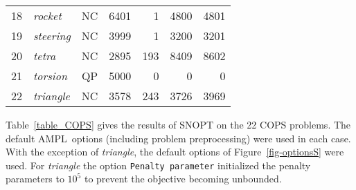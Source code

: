 \documentclass[draft,leqno,onefignum,onetabnum]{siamltex}
\def\strutl{\rule[-1.25ex]{0pt}{3ex}}%
\def\v#1{\texttt{#1}}
\def\AMPL  {{\small AMPL}}
\def\COPS  {{\small COPS}}
\def\SNOPT {{\small SNOPT}}
\def\Cute#1{\hbox{\it\lowercase{#1}\/}}
\begin{document}
\begin{table}[t]
\begin{center}
\begin{tabular}{|c|l|c|r|r|r|r|}
\\             18&\Cute{rocket}     & NC & 6401 &     1 &   4800 &  4801
\\             19&\Cute{steering}   & NC & 3999 &     1 &   3200 &  3201
\\             20&\Cute{tetra}      & NC & 2895 &   193 &   8409 &  8602
\\             21&\Cute{torsion}    & QP & 5000 &     0 &      0 &     0
\\\strutl      22&\Cute{triangle}   & NC & 3578 &   243 &   3726 &  3969
\\\hline
\end{tabular}
\end{center}
\end{table}



Table~\ref{table_COPS} gives the results of \SNOPT{} on the 22 \COPS{}
problems. The default \AMPL\ options (including problem preprocessing)
were used in each case.  With the exception of \Cute{triangle}, the
default options of Figure~\ref{fig-optionsS} were used.  For
\Cute{triangle} the option \v{Penalty parameter} initialized the
penalty parameters to $10^5$ to prevent the objective becoming
unbounded.
\end{document}

